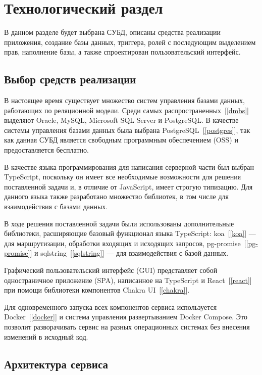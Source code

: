 \chapter{Технологический раздел}

В данном разделе будет выбрана СУБД, описаны средства реализации приложения, создание базы данных, триггера, ролей с последующим выделением прав, наполнение базы, а также спроектирован пользовательский интерфейс.

\section{Выбор средств реализации}

В настоящее время существует множество систем управления базами данных, работающих по реляционной модели. Среди самых распространенных~[\ref{dmbs}] выделяют Oracle, MySQL, Microsoft SQL Server и PostgreSQL. В качестве системы управления базами данных была выбрана PostgreSQL~[\ref{postgres}], так как данная СУБД является свободным программным обеспечением (OSS) и предоставляется бесплатно.

В качестве языка программирования для написания серверной части был выбран TypeScript, поскольку он имеет все необходимые возможности для решения поставленной задачи и, в отличие от JavaScript, имеет строгую типизацию. Для данного языка также разработано множество библиотек, в том числе для взаимодействия с базами данных.

В ходе решения поставленной задачи были использованы дополнительные библиотеки, расширяющие базовый функционал языка TypeScript: koa~[\ref{koa}] --- для маршрутизации, обработки входящих и исходящих запросов, pg-promise~[\ref{pg-promise}] и sqlstring~[\ref{sqlstring}] --- для взаимодействия с базой данных.

Графический пользовательский интерфейс (GUI) представляет собой одностраничное приложение (SPA), написанное на TypeScript и React~[\ref{react}] при помощи библиотеки компонентов Chakra UI~[\ref{chakra}].

Для одновременного запуска всех компонентов сервиса используется Docker~[\ref{docker}] и система управления развертыванием Docker Compose. Это позволит разворачивать сервис на разных операционных системах без внесения изменений в исходный код.

\section{Архитектура сервиса}

